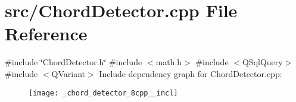\section{src/\+Chord\+Detector.cpp File Reference}
\label{_chord_detector_8cpp}
{\ttfamily \#include \char`\"{}Chord\+Detector.\+h\char`\"{}}\newline
{\ttfamily \#include $<$math.\+h$>$}\newline
{\ttfamily \#include $<$Q\+Sql\+Query$>$}\newline
{\ttfamily \#include $<$Q\+Variant$>$}\newline
Include dependency graph for Chord\+Detector.\+cpp\+:\nopagebreak
\begin{figure}[H]
\begin{center}
\leavevmode
\texttt{[image: \_chord\_detector\_8cpp\_\_incl]}
\end{center}
\end{figure}
